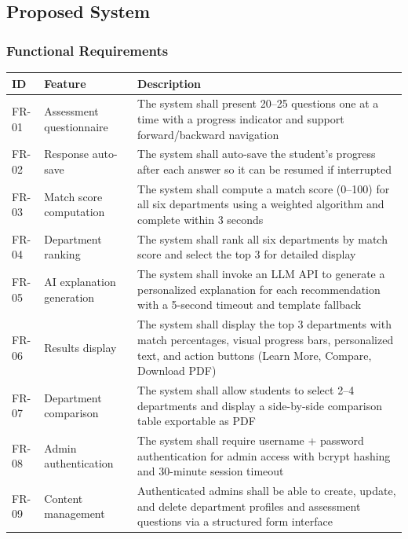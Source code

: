 ﻿\documentclass[12pt, a4paper]{article}
\newcommand{\theadrow}{\rowcolor{tableheader}}
\newcommand{\rowalt}{\rowcolor{tablerowalt}}
\begin{document}
\subsection{Proposed System}

\subsubsection*{Functional Requirements}

\begin{table}[H]
\centering
\begin{tabularx}{\textwidth}{p{1.2cm}p{3.5cm}X}
\toprule
\theadrow
\textbf{ID} & \textbf{Feature} & \textbf{Description} \\
\midrule
FR-01 & Assessment questionnaire & The system shall present 20--25 questions one at a time with a progress indicator and support forward/backward navigation \\[4pt]
\rowalt
FR-02 & Response auto-save & The system shall auto-save the student's progress after each answer so it can be resumed if interrupted \\[4pt]
FR-03 & Match score computation & The system shall compute a match score (0--100) for all six departments using a weighted algorithm and complete within 3 seconds \\[4pt]
\rowalt
FR-04 & Department ranking & The system shall rank all six departments by match score and select the top 3 for detailed display \\[4pt]
FR-05 & AI explanation generation & The system shall invoke an LLM API to generate a personalized explanation for each recommendation with a 5-second timeout and template fallback \\[4pt]
\rowalt
FR-06 & Results display & The system shall display the top 3 departments with match percentages, visual progress bars, personalized text, and action buttons (Learn More, Compare, Download PDF) \\[4pt]
FR-07 & Department comparison & The system shall allow students to select 2--4 departments and display a side-by-side comparison table exportable as PDF \\[4pt]
\rowalt
FR-08 & Admin authentication & The system shall require username + password authentication for admin access with bcrypt hashing and 30-minute session timeout \\[4pt]
FR-09 & Content management & Authenticated admins shall be able to create, update, and delete department profiles and assessment questions via a structured form interface \\[4pt]

\end{tabularx}
\end{table}
\end{document}
